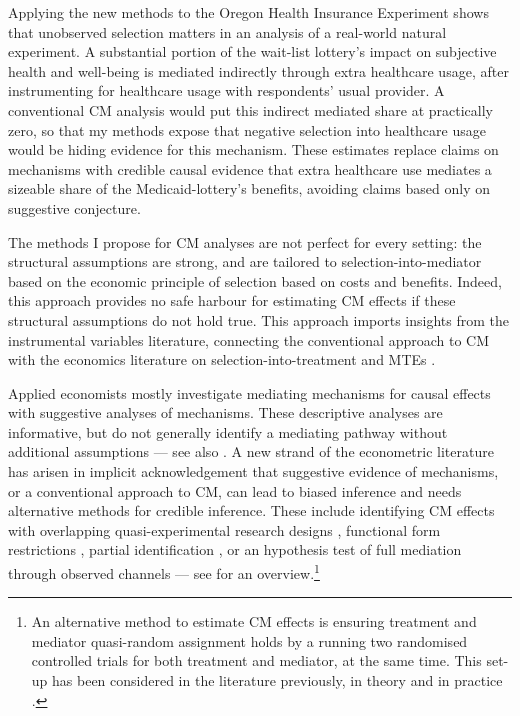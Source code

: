Applying the new methods to the Oregon Health Insurance Experiment shows that unobserved selection matters in an analysis of a real-world natural experiment.
A substantial portion of the wait-list lottery's impact on subjective health and well-being is mediated indirectly through extra healthcare usage, after instrumenting for healthcare usage with respondents' usual provider.
A conventional CM analysis would put this indirect mediated share at practically zero, so that my methods expose that negative selection into healthcare usage would be hiding evidence for this mechanism.
These estimates replace claims on mechanisms with credible causal evidence that extra healthcare use mediates a sizeable share of the Medicaid-lottery's benefits, avoiding claims based only on suggestive conjecture.

The methods I propose for CM analyses are not perfect for every setting: the structural assumptions are strong, and are tailored to selection-into-mediator based on the economic principle of selection based on costs and benefits.
Indeed, this approach provides no safe harbour for estimating CM effects if these structural assumptions do not hold true.
This approach imports insights from the instrumental variables literature, connecting the conventional \cite{imai2010identification} approach to CM with the economics literature on selection-into-treatment and MTEs \citep{vytlacil2002independence,heckman2004using,heckman2005structural,florens2008identification,brinch2017beyond,kline2019heckits}.

Applied economists mostly investigate mediating mechanisms for causal effects with suggestive analyses of mechanisms.
These descriptive analyses are informative, but do not generally identify a mediating pathway without additional assumptions --- see also \citet{blackwell2024assumption,green2010enough}.
A new strand of the econometric literature has arisen in implicit acknowledgement that suggestive evidence of mechanisms, or a conventional approach to CM, can lead to biased inference and needs alternative methods for credible inference.
These include identifying CM effects with overlapping quasi-experimental research designs \citep{deuchert2019direct,frolich2017direct}, functional form restrictions \citep{heckman2015econometric,heckman2013understanding}, partial identification \citep{flores2009identification}, or an hypothesis test of full mediation through observed channels \citep{kwon2024testing} --- see \cite{huber2019review} for an overview.\footnote{
    An alternative method to estimate CM effects is ensuring treatment and mediator quasi-random assignment holds by a running two randomised controlled trials for both treatment and mediator, at the same time.
    This set-up has been considered in the literature previously, in theory \citep{imai2013experimental} and in practice \citep{ludwig2011mechanism}.
}

